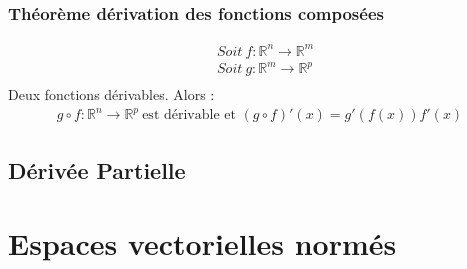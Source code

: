 \documentclass[11pt]{article}
\begin{document}
            \subsubsection{Théorème dérivation des fonctions composées}
            \begin{align*}
                &Soit \ f:\mathbb{R}^n \longrightarrow \mathbb{R}^m \\
                &Soit \ g:\mathbb{R}^m \longrightarrow \mathbb{R}^p \\
            \end{align*}
            Deux fonctions dérivables. Alors : 
            \begin{align*}
                g \circ f:\mathbb{R}^n \longrightarrow \mathbb{R}^p \ \text{est dérivable et } (g \circ f)'(x)=g'(f(x))f'(x)
            \end{align*}
        \subsection{Dérivée Partielle}
    \section{Espaces vectorielles normés}
\end{document}
